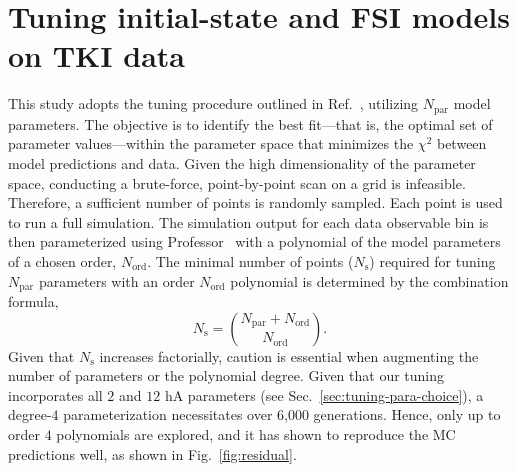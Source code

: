 \section{\label{sec:Tuning}Tuning initial-state and FSI models on TKI data}

This study adopts the tuning procedure outlined in Ref.~\cite{GENIE:2022qrc}, utilizing $N_{\textrm{par}}$ model parameters. The objective is to identify the best fit---that is, the optimal set of parameter values---within the parameter space that minimizes the $\chi^2$ between model predictions and data. Given the high dimensionality of the parameter space, conducting a brute-force, point-by-point scan on a grid is infeasible. Therefore, a sufficient number of points is randomly sampled. Each point is used to run a full simulation. The simulation output for each data observable bin is then parameterized using Professor~\cite{Buckley:2009bj} with a polynomial of the model parameters of a chosen order, $N_{\textrm{ord}}$. The minimal number of points ($N_{\textrm{s}}$) required for tuning $N_{\textrm{par}}$ parameters with an order $N_{\textrm{ord}}$ polynomial is determined by the combination formula,
\begin{equation}
    N_{\textrm{s}} = \binom{N_{\textrm{par}}+N_{\textrm{ord}}}{N_{\textrm{ord}}}.
\end{equation}
Given that $N_\textrm{s}$ increases factorially, caution is essential when augmenting the number of parameters or the polynomial degree. Given that our tuning incorporates all $2$ \sfcfg and $12$ hA parameters (see Sec.~\ref{sec:tuning-para-choice}), a degree-$4$ parameterization  necessitates over 6,000 generations. Hence, only up to order $4$ polynomials are explored, and it has shown to reproduce the MC predictions well, as shown in Fig.~\ref{fig:residual}. 

